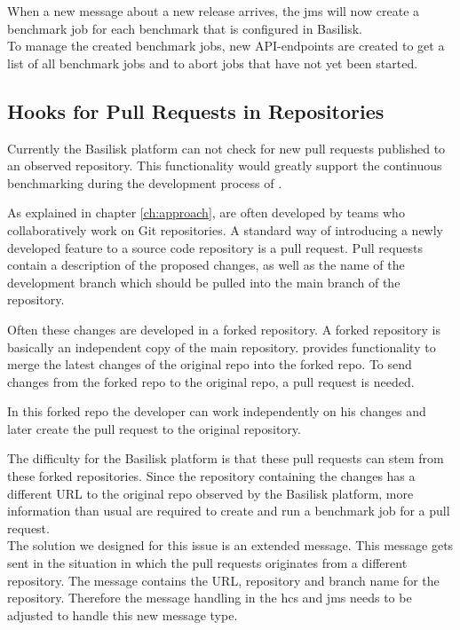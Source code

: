 When a new message about a new release arrives, the \ac{jms} will now create a benchmark job for each benchmark that is configured in Basilisk.
\\

To manage the created benchmark jobs, new API-endpoints are created to get a list of all benchmark jobs and to abort jobs that have not yet been started.


\subsection{Hooks for Pull Requests in \gh{} Repositories}
\label{sec:pullrequests_hcs_design}
Currently the Basilisk platform can not check for new pull requests published to an observed repository.
This functionality would greatly support the continuous benchmarking during the development process of \tsp{}.

As explained in chapter \ref{ch:approach}, \tsp{} are often developed by teams who collaboratively work on Git repositories.
A standard way of introducing a newly developed feature to a source code repository is a pull request.
Pull requests contain a description of the proposed changes, as well as the name of the development branch which should be pulled into the main branch of the repository.

Often these changes are developed in a forked repository.
A forked repository is basically an independent copy of the main repository.
\gh{} provides functionality to merge the latest changes of the original repo into the forked repo.
To send changes from the forked repo to the original repo, a pull request is needed.

In this forked repo the developer can work independently on his changes and later create the pull request to the original repository.

The difficulty for the Basilisk platform is that these pull requests can stem from these forked repositories.
Since the repository containing the changes has a different URL to the original repo observed by the Basilisk platform, more information than usual are required to create and run a benchmark job for a pull request.
\\

The solution we designed for this issue is an extended message.
This message gets sent in the situation in which the pull requests originates from a different repository.
The message contains the URL, repository and branch name for the \gh{} repository.
Therefore the message handling in the \ac{hcs} and \ac{jms} needs to be adjusted to handle this new message type.

